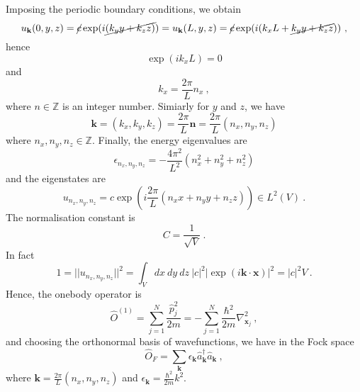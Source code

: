     Imposing the periodic boundary conditions, we obtain 
    \begin{equation*}
        u_{\mathbf k} (0,y,z) = \cancel{c} \exp(i \cancel{(k_y y + k_z z)}) = u_{\mathbf k} (L,y,z) = \cancel{c} \exp(i (k_x L + \cancel{k_y y + k_z z})) ~,
    \end{equation*}
    hence
    \begin{equation*}
        \exp(i k_x L) = 0 
    \end{equation*}
    and 
    \begin{equation*}
        k_x = \frac{2 \pi}{L} n_x ~,
    \end{equation*}
    where $n \in \mathbb Z$ is an integer number. Simiarly for $y$ and $z$, we have 
    \begin{equation*}
        \mathbf k = (k_x, k_y, k_z) = \frac{2\pi}{L} \mathbf n = \frac{2\pi}{L} (n_x, n_y, n_z) 
    \end{equation*}
    where $n_x, n_y, n_z \in \mathbb Z$. Finally, the energy eigenvalues are 
    \begin{equation*}
        \epsilon_{n_x, n_y, n_z} = - \frac{4\pi^2}{L^2} (n_x^2 + n_y^2 + n_z^2) 
    \end{equation*}
    and the eigenstates are 
    \begin{equation*}
        u_{n_x, n_y, n_z} = c \exp(i \frac{2\pi}{L} (n_x x + n_y y + n_z z)) \in L^2(V) ~.
    \end{equation*}
    The normalisation constant is 
    \begin{equation*}
        C = \frac{1}{\sqrt{V}} ~.
    \end{equation*}
    In fact 
    \begin{equation*}
        1 = ||u_{n_x, n_y, n_z} ||^2 = \int_V dx ~ dy ~ dz ~ |c|^2 |\exp(i \mathbf k \cdot \mathbf x)|^2 = |c|^2 V ~.
    \end{equation*}
    Hence, the onebody operator is 
    \begin{equation*}
        \hat O^{(1)} = \sum_{j=1}^{N} \frac{\hat p^2_j}{2m} = - \sum_{j=1}^{N} \frac{\hbar^2}{2m} \nabla^2_{\mathbf x_j} ~,
    \end{equation*}
    and choosing the orthonormal basis of wavefunctions, we have in the Fock space 
    \begin{equation*}
        \hat O_F = \sum_{\mathbf k} \epsilon_{\mathbf k} \hat a^\dagger_{\mathbf k} \hat a_{\mathbf k} ~,
    \end{equation*}
    where $\mathbf k = \frac{2\pi}{L} (n_x, n_y, n_z)$ and $\epsilon_{\mathbf k} = \frac{\hbar^2}{2m} k^2$.
    

